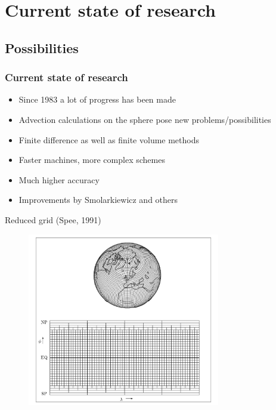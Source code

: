 \documentclass[hyperref={pdfstartview=Fit,pdfpagemode=FullScreen}]{beamer}
\newcommand{\imsize}{}
\begin{document}
\section{Current state of research}
\subsection{Possibilities}
\begin{frame}
\frametitle{Current state of research}
\begin{itemize}
\item Since 1983 a lot of progress has been made
\item Advection calculations on the sphere pose new problems/possibilities
\item Finite difference as well as finite volume methods 
\item Faster machines, more complex schemes
\item Much higher accuracy
\item Improvements by Smolarkiewicz and others
\end{itemize}
\end{frame}

\begin{frame}
Reduced grid (Spee, 1991)
\begin{figure}
\renewcommand{\imsize}{0.75\textwidth}
\includegraphics[width=\imsize]{globe}%
\end{figure}
\end{frame}
\end{document}
